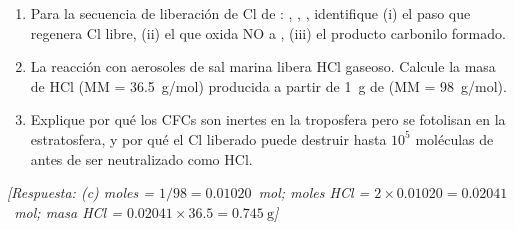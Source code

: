 \begin{bloque_ejercicios}
\begin{ejercicios}
\begin{enumerate}[label=\alph*)]
    \item Para la secuencia de liberaci\'on de Cl de :
          ,
          ,
          ,
          identifique (i) el paso que regenera Cl libre,
          (ii) el que oxida NO a ,
          (iii) el producto carbonilo formado.

    \item La reacci\'on con aerosoles de sal marina
          libera HCl gaseoso. Calcule la masa de HCl
          (MM = 36.5~g/mol) producida a partir de
          \SI{1}{\gram} de  (MM = 98~g/mol).

    \item Explique por qu\'e los CFCs son inertes en
          la troposfera pero se fotolisan en la estratosfera,
          y por qu\'e el Cl liberado puede destruir hasta
          $10^5$ mol\'eculas de  antes de ser
          neutralizado como HCl.
\end{enumerate}

\textit{[Respuesta:
(c) moles  = $1/98 = 0.01020$~mol;
    moles HCl = $2\times0.01020 = 0.02041$~mol;
    masa HCl = $0.02041\times36.5
    = \SI{0.745}{\gram}$]}

\end{ejercicios}
\end{bloque_ejercicios}
